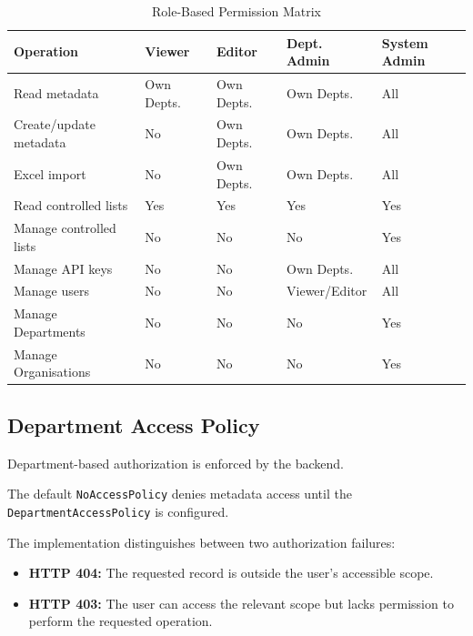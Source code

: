 \documentclass[11pt,a4paper]{article}
\begin{document}
\begin{table}[htbp]
\centering
\caption{Role-Based Permission Matrix}
\label{tab:phase3_permissions}
\scriptsize
\begin{tabularx}{\textwidth}{
P{3.5cm}
P{2.2cm}
P{2.2cm}
P{2.5cm}
L
}
\toprule
\textbf{Operation} &
\textbf{Viewer} &
\textbf{Editor} &
\textbf{Dept. Admin} &
\textbf{System Admin} \\
\midrule

Read metadata &
Own Depts. &
Own Depts. &
Own Depts. &
All \\

Create/update metadata &
No &
Own Depts. &
Own Depts. &
All \\

Excel import &
No &
Own Depts. &
Own Depts. &
All \\

Read controlled lists &
Yes &
Yes &
Yes &
Yes \\

Manage controlled lists &
No &
No &
No &
Yes \\

Manage API keys &
No &
No &
Own Depts. &
All \\

Manage users &
No &
No &
Viewer/Editor &
All \\

Manage Departments &
No &
No &
No &
Yes \\

Manage Organisations &
No &
No &
No &
Yes \\

\bottomrule
\end{tabularx}
\end{table}

\subsection{Department Access Policy}

Department-based authorization is enforced
by the backend.

The default \texttt{NoAccessPolicy} denies
metadata access until the
\texttt{DepartmentAccessPolicy} is configured.

The implementation distinguishes between
two authorization failures:

\begin{itemize}
    \item \textbf{HTTP 404:} The requested record
    is outside the user's accessible scope.

    \item \textbf{HTTP 403:} The user can access
    the relevant scope but lacks permission
    to perform the requested operation.
\end{itemize}
\end{document}
